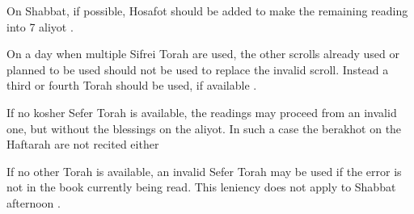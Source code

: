 On Shabbat, if possible, Hosafot should be added to make the remaining reading into 7 aliyot \parencite*[24:7]{Kitzur}.

On a day when multiple Sifrei Torah are used, the other scrolls already used or planned to be used should not be used to replace the invalid scroll.  Instead a third or fourth Torah should be used, if available \parencite*[78:10]{Kitzur}.

If no kosher Sefer Torah is available, the readings may proceed from an invalid one, but without the blessings on the aliyot.  In such a case the berakhot on the Haftarah are not recited either \parencite*[79:10]{Kitzur}

If no other Torah is available, an invalid Sefer Torah may be used if the error is not in the book currently being read.  This leniency does not apply to Shabbat afternoon \parencite*[24:10]{Kitzur}.
